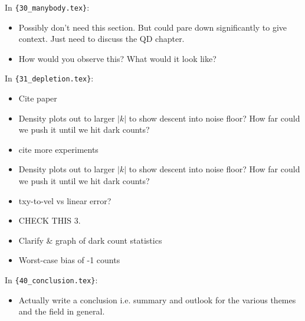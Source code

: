 In \verb|{30_manybody.tex}|:
\begin{itemize}
\item {Possibly don't need this section. But could pare down significantly to give context. Just need to discuss the QD chapter.}
\item {How would you observe this?  What would it look like?}
\end{itemize}
In \verb|{31_depletion.tex}|:
\begin{itemize}
\item {Cite paper}
\item {Density plots out to larger $|k|$ to show descent into noise floor? How far could we push it until we hit dark counts?}
\item {cite more experiments}
\item {Density plots out to larger $|k|$ to show descent into noise floor? How far could we push it until we hit dark counts?}
\item {txy-to-vel vs linear error?}
\item {CHECK THIS 3.}
\item {Clarify \& graph of dark count statistics}
\item {Worst-case bias of -1 counts}
\end{itemize}
In \verb|{40_conclusion.tex}|:
\begin{itemize}
\item {Actually write a conclusion i.e. summary and outlook for the various themes and the field in general.}
\end{itemize}
